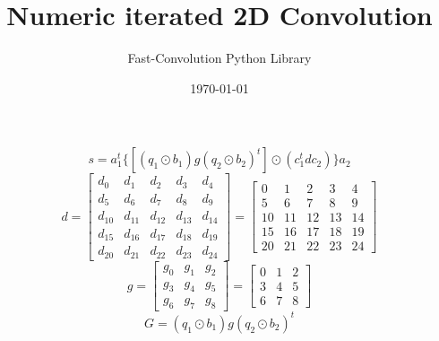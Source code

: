 \documentclass{article}%
\title{Numeric iterated 2D Convolution}%
\author{Fast{-}Convolution Python Library}%
\date{\today}%
\begin{document}
%
\normalsize%
\maketitle%
\[%
s=a_1^t \{[(q_1 \odot b_1) g (q_2 \odot b_2)^t] \odot (c_1^t d c_2)\}a_2%
\]%
\[%
d = \left[\begin{matrix}d_{0} & d_{1} & d_{2} & d_{3} & d_{4}\\d_{5} & d_{6} & d_{7} & d_{8} & d_{9}\\d_{10} & d_{11} & d_{12} & d_{13} & d_{14}\\d_{15} & d_{16} & d_{17} & d_{18} & d_{19}\\d_{20} & d_{21} & d_{22} & d_{23} & d_{24}\end{matrix}\right] = \left[\begin{matrix}0 & 1 & 2 & 3 & 4\\5 & 6 & 7 & 8 & 9\\10 & 11 & 12 & 13 & 14\\15 & 16 & 17 & 18 & 19\\20 & 21 & 22 & 23 & 24\end{matrix}\right]%
\]%
\[%
g = \left[\begin{matrix}g_{0} & g_{1} & g_{2}\\g_{3} & g_{4} & g_{5}\\g_{6} & g_{7} & g_{8}\end{matrix}\right] = \left[\begin{matrix}0 & 1 & 2\\3 & 4 & 5\\6 & 7 & 8\end{matrix}\right]%
\]%
\[%
G = (q_1 \odot b_1) g (q_2 \odot b_2)^t%
\]%
\end{document}
